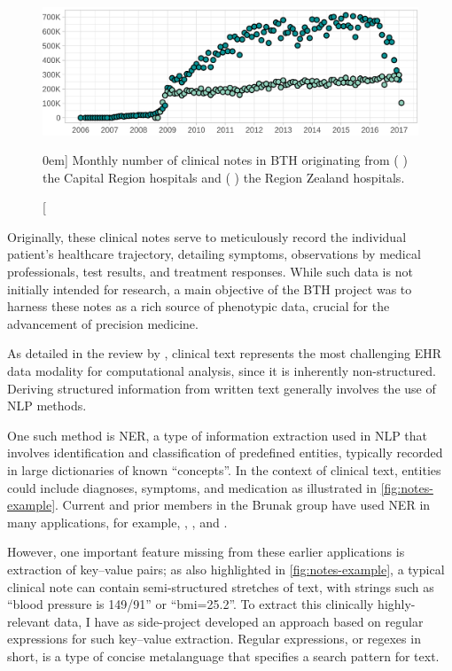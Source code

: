 \begin{figure}[bt]
    \includegraphics[width=\textwidth, trim=10mm 0 0 0]{graphics/bth-notes}
    \caption[Overview of \acs{BTH} clinical notes][0em]{%
        Monthly number of clinical notes in \acf*{BTH}
        originating from 
        (\,\,) the Capital Region hospitals and 
        (\,\,) the Region Zealand hospitals.
    }
    \label{fig:notes-overview}
\end{figure}%

Originally, these clinical notes serve to meticulously record 
the individual patient's healthcare trajectory, detailing symptoms, 
observations by medical professionals, test results, 
and treatment responses.
While such data is not initially intended for research,
a main objective of the \ac{BTH} project was to harness
these notes as a rich source of phenotypic data,
crucial for the advancement of precision medicine.

As detailed in the review by \textcite{jensenMining2012}, 
clinical text represents the most challenging \ac{EHR} data modality for 
computational analysis, since it is inherently non-structured.
Deriving structured information from written text generally involves the
use of \ac{NLP} methods.
~\autocite{jensenMining2012}

One such method is \ac{NER}, a type of information extraction 
used in \ac{NLP} that involves identification and classification 
of predefined entities, typically recorded in large dictionaries
of known \enquote{concepts}.
In the context of clinical text,
entities could include diagnoses, symptoms, and medication
as illustrated in \cref{fig:notes-example}.
Current and prior members in the Brunak group 
have used \ac{NER} in many applications, 
for example,
\textcite{sorupSex2020},
\textcite{hjaltelinPancreatic2023},
and  
\textcite{kirkLinking2019}.

However, one important feature missing from these earlier applications 
is extraction of key--value pairs;
as also highlighted in \cref{fig:notes-example}, 
a typical clinical note can contain
semi-structured stretches of text,
with strings such as \enquote{blood pressure is 149/91}
or \enquote{bmi=25.2}.
To extract this clinically highly-relevant data,
I have as side-project developed an approach based 
on regular expressions for such key--value extraction.
Regular expressions, or regexes in short, 
is a type of concise metalanguage 
that specifies a search pattern for text.
~\autocite{Regular2023}


